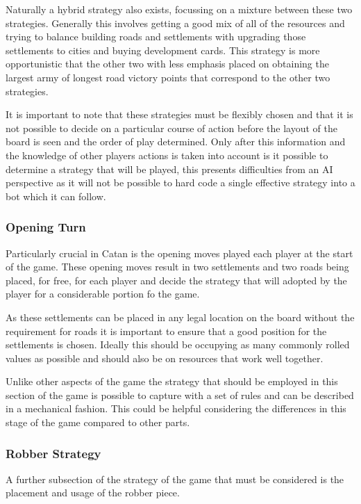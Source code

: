 \documentclass[]{article}
\begin{document}
\par Naturally a hybrid strategy also exists, focussing on a mixture between these two strategies. Generally this involves getting a good mix of all of the resources and trying to balance building roads and settlements with upgrading those settlements to cities and buying development cards. This strategy is more opportunistic that the other two with less emphasis placed on obtaining the largest army of longest road victory points that correspond to the other two strategies. 

\par It is important to note that these strategies must be flexibly chosen and that it is not possible to decide on a particular course of action before the layout of the board is seen and the order of play determined. Only after this information and the knowledge of other players actions is taken into account is it possible to determine a strategy that will be played, this presents difficulties from an AI perspective as it will not be possible to hard code a single effective strategy into a bot which it can follow.

\subsubsection{Opening Turn}
Particularly crucial in Catan is the opening moves played each player at the start of the game. These opening moves result in two settlements and two roads being placed, for free, for each player and decide the strategy that will adopted by the player for a considerable portion fo the game. 

\par As these settlements can be placed in any legal location on the board without the requirement for roads it is important to ensure that a good position for the settlements is chosen. Ideally this should be occupying as many commonly rolled values as possible and should also be on resources that work well together.

\par Unlike other aspects of the game the strategy that should be employed in this section of the game is possible to capture with a set of rules and can be described in a mechanical fashion. This could be helpful considering the differences in this stage of the game compared to other parts.

\subsubsection{Robber Strategy}
A further subsection of the strategy of the game that must be considered is the placement and usage of the robber piece. 
\end{document}
